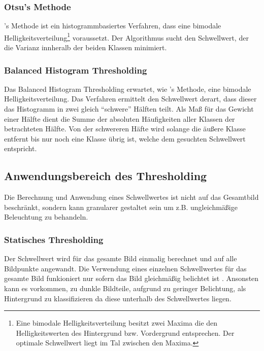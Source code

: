 
\subsubsection*{Otsu's Methode}
's Methode \cite{otsu1979} ist ein histogrammbasiertes Verfahren, dass eine bimodale Helligkeitsverteilung\footnote{Eine bimodale Helligkeitsverteilung besitzt zwei Maxima die den Helligkeitswerten des Hintergrund bzw. Vordergrund entsprechen. Der optimale Schwellwert liegt im Tal zwischen den Maxima.} voraussetzt.
Der Algorithmus sucht den Schwellwert, der die Varianz innheralb der beiden Klassen minimiert.

\subsubsection*{Balanced Histogram Thresholding}
Das Balanced Histogram Thresholding \cite{DBLP:conf/biostec/AnjosS08} erwartet, wie 's Methode, eine bimodale Helligkeitsverteilung.
Das Verfahren ermittelt den Schwellwert derart, dass dieser das Histogramm in zwei gleich "`schwere"' Hälften teilt.
Als Maß für das Gewicht einer Hälfte dient die Summe der absoluten Häufigkeiten aller Klassen der betrachteten Hälfte.
Von der schwereren Häfte wird solange die äußere Klasse entfernt bis nur noch eine Klasse übrig ist, welche dem gesuchten Schwellwert entspricht.

\subsection*{Anwendungsbereich des Thresholding}
Die Berechnung und Anwendung eines Schwellwertes ist nicht auf das Gesamtbild beschränkt, sondern kann granularer gestaltet sein um z.B. ungleichmäßige Beleuchtung zu behandeln.

\subsubsection*{Statisches Thresholding}
Der Schwellwert wird für das gesamte Bild einmalig berechnet und auf alle Bildpunkte angewandt.
Die Verwendung eines einzelnen Schwellwertes für das gesamte Bild funkioniert nur sofern das Bild gleichmäßig belichtet ist \cite[Kap.~4.3]{davies2012}.
Ansonsten kann es vorkommen, zu dunkle Bildteile, aufgrund zu geringer Belichtung, als Hintergrund zu klassifizieren da diese unterhalb des Schwellwertes liegen.

